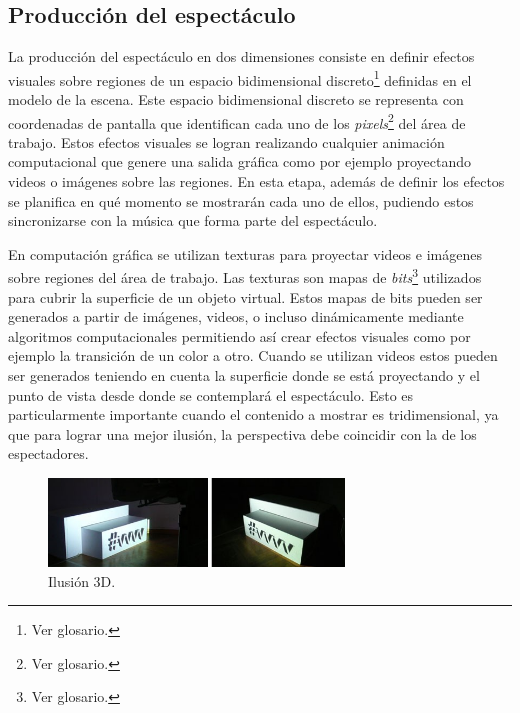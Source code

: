 \subsection{Producción del espectáculo}
La producción del espectáculo en dos dimensiones consiste en definir efectos visuales sobre regiones de un espacio bidimensional discreto\footnote{Ver glosario.} definidas en el modelo de la escena. Este espacio bidimensional discreto se representa con coordenadas de pantalla que identifican cada uno de los \emph{pixels}\footnote{Ver glosario.} del área de trabajo. Estos efectos visuales se logran realizando cualquier animación computacional que genere una salida gráfica como por ejemplo proyectando videos o imágenes sobre las regiones.
En esta etapa, además de definir los efectos se planifica en qué momento se mostrarán cada uno de ellos, pudiendo estos sincronizarse con la música que forma parte del espectáculo.

En computación gráfica se utilizan texturas para proyectar videos e imágenes sobre regiones del área de trabajo. Las texturas son mapas de \emph{bits}\footnote{Ver glosario.} utilizados para cubrir la superficie de un objeto virtual. Estos mapas de bits pueden ser generados a partir de imágenes, videos, o incluso dinámicamente mediante algoritmos computacionales permitiendo así crear efectos visuales como por ejemplo la transición de un color a otro.
Cuando se utilizan videos estos pueden ser generados teniendo en cuenta la superficie donde se está proyectando y el punto de vista desde donde se contemplará el espectáculo. Esto es particularmente importante cuando el contenido a mostrar es tridimensional, ya que para lograr una mejor ilusión, la perspectiva debe coincidir con la de los espectadores.
\begin{figure}[H]
  \centering
    \includegraphics[width=0.7\textwidth]{./Cap2_videomapping/3dillusion}
  \caption{Ilusión 3D.}
  \label{fig:3dillusion}
\end{figure}

